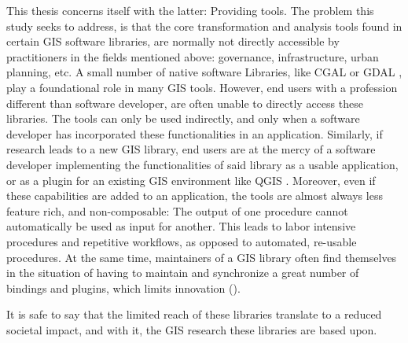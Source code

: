 This thesis concerns itself with the latter: Providing tools. 
The problem this study seeks to address, is that the core transformation and analysis tools found in certain \ac{GIS} software libraries, are normally not directly accessible by practitioners in the fields mentioned above: governance, infrastructure, urban planning, etc.
A small number of native software Libraries, like CGAL or GDAL \citep*{fabri_cgal_2009,dohler_gdal_2022}, play a foundational role in many \ac{GIS} tools. 
However, end users with a profession different than software developer, are often unable to directly access these libraries. 
The tools can only be used indirectly, and only when a software developer has incorporated these functionalities in an application. 
Similarly, if research leads to a new \ac{GIS} library, end users are at the mercy of a software developer implementing the functionalities of said library as a usable application, or as a plugin for an existing \ac{GIS} environment like QGIS \citep*{qgis_community_qgis_2022}.
Moreover, even if these capabilities are added to an application, the tools are almost always less feature rich, and non-composable: The output of one procedure cannot automatically be used as input for another. This leads to labor intensive procedures and repetitive workflows, as opposed to automated, re-usable procedures.
At the same time, maintainers of a \ac{GIS} library often find themselves in the situation of having to maintain and synchronize a great number of bindings and plugins, which limits innovation ().

It is safe to say that the limited reach of these libraries translate to a reduced societal impact, and with it, the \ac{GIS} research these libraries are based upon.


